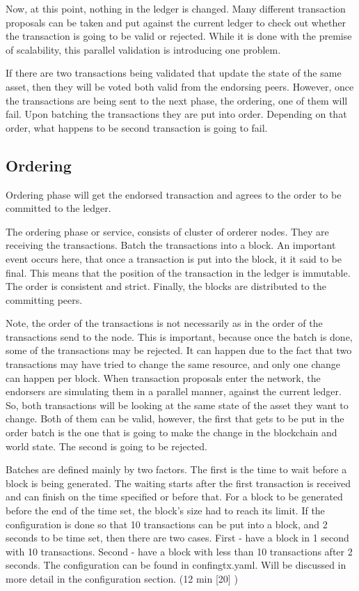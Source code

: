 \documentclass[a4paper,11pt]{report}
\begin{document}
	Now, at this point, nothing in the ledger is changed. Many different transaction proposals can be taken and put against the current ledger to check out whether the transaction is going to be valid or rejected. While it is done with the premise of scalability, this parallel validation is introducing one problem. 
	
	If there are two transactions being validated that update the state of the same asset, then they will be voted both valid from the endorsing peers. However, once the transactions are being sent to the next phase, the ordering, one of them will fail. Upon batching the transactions they are put into order. Depending on that order, what happens to be second transaction is going to fail.

\subsection{Ordering}
Ordering phase will get the endorsed transaction and agrees to the order to be committed to the ledger.

The ordering phase or service, consists of cluster of orderer nodes. They are receiving the transactions. Batch the transactions into a block. An important event occurs here, that once a transaction is put into the block, it it said to be final. This means that the position of the transaction in the ledger is immutable. The order is consistent and strict. Finally, the blocks are distributed to the committing peers.
	
	Note, the order of the transactions is not necessarily as in the order of the transactions send to the node. This is important, because once the batch is done, some of the transactions may be rejected. It can happen due to the fact that two transactions may have tried to change the same resource, and only one change can happen per block. When transaction proposals enter the network, the endorsers are simulating them in a parallel manner, against the current ledger. So, both transactions will be looking at the same state of the asset they want to change. Both of them can be valid, however, the first that gets to be put in the order batch is the one that is going to make the change in the blockchain and world state. The second is going to be rejected.
	
Batches are defined mainly by two factors. The first is the time to wait before a block is being generated. The waiting starts after the first transaction is received and can finish on the time specified or before that. For a block to be generated before the end of the time set, the block’s size had to reach its limit. If the configuration is done so that 10 transactions can be put into a block, and 2 seconds to be time set, then there are two cases. First - have a block in 1 second with 10 transactions. Second - have a block with less than 10 transactions after 2 seconds. The configuration can be found in confingtx.yaml. Will be discussed in more detail in the configuration section. (12 min [20] )
\end{document}
